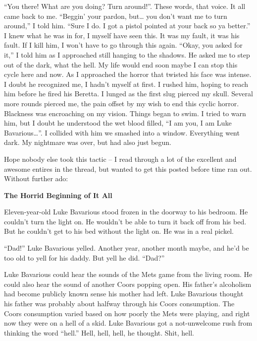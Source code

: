 ``You there! What are you doing? Turn around!''. These words, that
voice. It all came back to me. ``Beggin' your pardon, but{\ldots} you
don't want me to turn around,'' I told him. ``Sure I do. I got a
pistol pointed at your back so ya better.'' I knew what he was in
for, I myself have seen this. It was my fault, it was his fault. If
I kill him, I won't have to go through this again. ``Okay, you asked
for it,'' I told him as I approached still hanging to the shadows.
He asked me to step out of the dark, what the hell. My life would
end soon maybe I can stop this cycle here and now. As I approached
the horror that twisted his face was intense. I doubt he recognized
me, I hadn't myself at first. I rushed him, hoping to reach him
before he fired his Beretta. I lunged as the first slug pierced my
skull. Several more rounds pierced me, the pain offset by my wish
to end this cyclic horror. Blackness was encroaching on my vision.
Things began to swim. I tried to warn him, but I doubt he
understood the wet blood filled, ``I am you, I am Luke
Bavarious{\ldots}''. I collided with him we smashed into a window.
Everything went dark. My nightmare was over, but had also just
begun. 
 





Hope nobody else took this tactic -- I read through a lot of the
excellent and awesome entires in the thread, but wanted to get this
posted before time ran out. Without further ado:



{\bf The Horrid Beginning of It All}



Eleven-year-old Luke Bavarious stood frozen in the doorway to his
bedroom. He couldn't turn the light on. He wouldn't be
able to turn it back off from his bed. But he couldn't get to
his bed without the light on. He was in a real pickel.



``Dad!'' Luke Bavarious yelled. Another year, another
month maybe, and he'd be too old to yell for his daddy. But
yell he did. ``Dad?''



Luke Bavarious could hear the sounds of the Mets game from the
living room. He could also hear the sound of another Coors popping
open. His father's alcoholism had become publicly known sense
his mother had left. Luke Bavarious thought his father was probably
about halfway through his Coors consumption. The Coors consumption
varied based on how poorly the Mets were playing, and right now
they were on a hell of a skid. Luke Bavarious got a not-unwelcome
rush from thinking the word ``hell.'' Hell, hell, hell,
he thought. Shit, hell.



